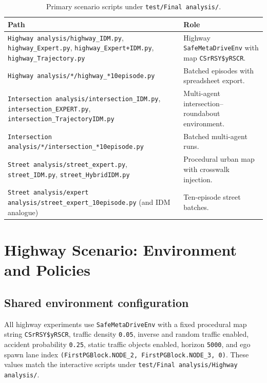 \documentclass[12pt,a4paper]{report}
\begin{document}
\begin{table}[H]
    \centering
    \caption{Primary scenario scripts under \texttt{test/Final analysis/}.}
    \label{tab:script_map}
    \begin{tabularx}{\textwidth}{>{\raggedright\arraybackslash}p{4.2cm} X}
        \toprule
        Path & Role \\
        \midrule
        \texttt{Highway analysis/highway\_IDM.py}, \texttt{highway\_Expert.py}, \texttt{highway\_Expert+IDM.py}, \texttt{highway\_Trajectory.py} & Highway \texttt{SafeMetaDriveEnv} with map \texttt{CSrRSY\$yRSCR}. \\
        \texttt{Highway analysis/*/highway\_*10episode.py} & Batched episodes with spreadsheet export. \\
        \texttt{Intersection analysis/intersection\_IDM.py}, \texttt{intersection\_EXPERT.py}, \texttt{intersection\_TrajectoryIDM.py} & Multi-agent intersection--roundabout environment. \\
        \texttt{Intersection analysis/*/intersection\_*10episode.py} & Batched multi-agent runs. \\
        \texttt{Street analysis/street\_expert.py}, \texttt{street\_IDM.py}, \texttt{street\_HybridIDM.py} & Procedural urban map with crosswalk injection. \\
        \texttt{Street analysis/expert analysis/street\_expert\_10episode.py} (and IDM analogue) & Ten-episode street batches. \\
        \bottomrule
    \end{tabularx}
\end{table}

\section{Highway Scenario: Environment and Policies}
\subsection{Shared environment configuration}
All highway experiments use \texttt{SafeMetaDriveEnv} with a fixed procedural map string \texttt{CSrRSY\$yRSCR}, traffic density \texttt{0.05}, inverse and random traffic enabled, accident probability \texttt{0.25}, static traffic objects enabled, horizon \texttt{5000}, and ego spawn lane index \texttt{(FirstPGBlock.NODE\_2, FirstPGBlock.NODE\_3, 0)}. These values match the interactive scripts under \texttt{test/Final analysis/Highway analysis/}.
\end{document}
